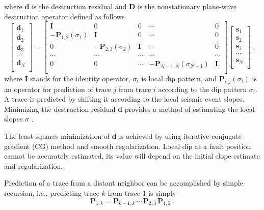 where $\mathbf{d}$ is the destruction residual and $\mathbf{D}$ is the
nonstationary plane-wave destruction operator defined as follows
\begin{equation}
  \label{eq:d}
  \left[\begin{array}{c}
     \mathbf{d}_1 \\
     \mathbf{d}_2 \\
     \mathbf{d}_3 \\
        \cdots \\
     \mathbf{d}_N  \\
 \end{array}\right] =
  \left[\begin{array}{ccccc}
      \mathbf{I} & 0 & 0 & \cdots & 0 \\
      - \mathbf{P}_{1,2}(\sigma_1) & \mathbf{I} & 0 & \cdots & 0 \\
      0 & - \mathbf{P}_{2,3}(\sigma_2) & \mathbf{I} & \cdots & 0 \\
      \cdots & \cdots & \cdots & \cdots & \cdots \\
      0 & 0 & \cdots & - \mathbf{P}_{N-1,N}(\sigma_{N-1}) & \mathbf{I} \\
    \end{array}\right]
  \left[\begin{array}{c}
     \mathbf{s}_1 \\
     \mathbf{s}_2 \\
     \mathbf{s}_3 \\
        \cdots \\
     \mathbf{s}_N  \\
 \end{array}\right]\;,
\end{equation}
where $\mathbf{I}$ stands for the identity operator, $\sigma_i$ is
local dip pattern, and $\mathbf{P}_{i,j}(\sigma_i)$ is an operator for
prediction of trace $j$ from trace $i$ according to the dip pattern
$\sigma_i$. A trace is predicted by shifting it according to the local
seismic event slopes. Minimizing the destruction residual $\mathbf{d}$
provides a method of estimating the local slopes $\sigma$
\cite[]{Fomel02}.

The least-squares minimization of $\mathbf{d}$ is achieved by using 
iterative conjugate-gradient (CG) method and smooth
regularization. Local dip at a fault position cannot be accurately
estimated, its value will depend on the initial slope estimate and
regularization.

Prediction of a trace from a distant neighbor can be
accomplished by simple recursion, i.e., predicting trace $k$ from
trace $1$ is simply
\begin{equation}
  \label{eq:pred}
  \mathbf{P}_{1,k} = \mathbf{P}_{k-1,k}\,
  \cdots\,\mathbf{P}_{2,3}\,\mathbf{P}_{1,2}\;.
\end{equation}

